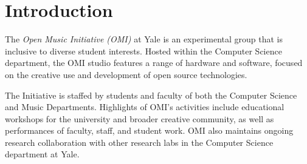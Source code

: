 \section{Introduction}

The \textit{Open Music Initiative (OMI)} at Yale is an experimental group that is inclusive to diverse student interests. Hosted within the Computer Science department, the OMI studio features a range of hardware and software, focused on the creative use and development of open source technologies.

The Initiative is staffed by students and faculty of both the Computer Science and Music Departments. Highlights of OMI's activities include educational workshops for the university and broader creative community, as well as performances of faculty, staff, and student work. OMI also maintains ongoing research collaboration with other research labs in the Computer Science department at Yale.


